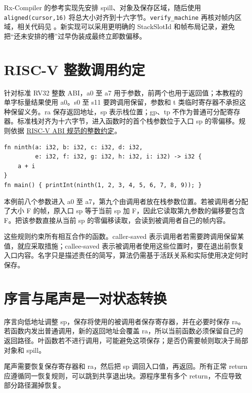 Rx-Compiler 的参考实现先安排 spill、对象及保存区域，随后使用 \texttt{aligned(cursor,16)} 将总大小对齐到十六字节。\texttt{verify\_machine} 再核对帧内区域，相关代码见 。新实现可以采用更明确的 StackSlotId 和帧布局记录，避免把“还未安排的槽”过早伪装成最终立即数偏移。

\section{RISC-V 整数调用约定}
针对标准 RV32 整数 ABI，a0 至 a7 用于参数，前两个也用于返回值；本教程的单字标量结果使用 a0。s0 至 s11 要跨调用保留，参数和 t 类临时寄存器不承担这种保留义务。ra 保存返回地址，sp 表示栈位置；gp、tp 不作为普通可分配寄存器。标准栈对齐为十六字节，进入函数时的首个栈参数位于入口 sp 的零偏移。规则依据 \href{https://riscv-non-isa.github.io/riscv-elf-psabi-doc/}{RISC-V ABI 规范的整数约定}。

\begin{lstlisting}[language=Rustless,caption={九个单字参数需要使用寄存器之外的位置}]
fn ninth(a: i32, b: i32, c: i32, d: i32,
         e: i32, f: i32, g: i32, h: i32, i: i32) -> i32 {
    a + i
}
fn main() { printInt(ninth(1, 2, 3, 4, 5, 6, 7, 8, 9)); }
\end{lstlisting}
本例前八个参数进入 a0 至 a7，第九个由调用者放在栈参数位置。若被调用者分配了大小 F 的帧，原入口 sp 等于当前 sp 加 F，因此它读取第九参数的偏移要包含 F。把该参数直接从当前 sp 的零偏移读取，会读到被调用者自己的帧内容。

这些规则约束所有相互合作的函数。caller-saved 表示调用者若需要跨调用保留某值，就应采取措施；callee-saved 表示被调用者使用这些位置时，要在退出前恢复入口内容。名字只是描述责任的简写，算法仍需基于活跃关系和实际使用决定何时保存。

\section{序言与尾声是一对状态转换}
序言向低地址调整 sp，保存将使用的被调用者保存寄存器，并在必要时保存 ra。若函数内发出普通调用，新的返回地址会覆盖 ra，所以当前函数必须保留自己的返回路径。叶函数若不进行调用，可能避免这项保存；是否仍需要帧则取决于局部对象和 spill。

尾声需要恢复保存寄存器和 ra，然后把 sp 调回入口值，再返回。所有正常 return 应遵循同一恢复规则，可以跳到共享退出块。源程序里有多个 return，不应导致部分路径漏掉恢复。

